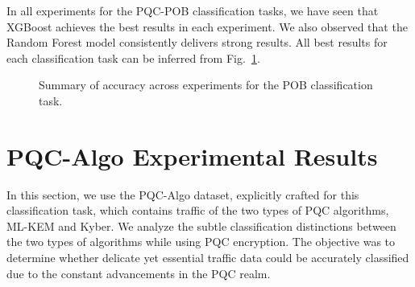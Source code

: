 \documentclass[10pt,journal]{IEEEtran}%
\begin{document}
In all experiments for the PQC-POB classification tasks, we have seen that XGBoost achieves the best results in each experiment. We also observed that the Random Forest model consistently delivers strong results. All best results for each classification task can be inferred from Fig.~\ref{fig:accuracy_experiments}.
\begin{figure}[htbp]
\centering
\footnotesize
{}
\caption{Summary of accuracy across experiments for the POB classification task.}
\label{fig:accuracy_experiments}
\end{figure}


\section{PQC-Algo Experimental Results}
\label{sec:algoex}
In this section, we use the PQC-Algo dataset, explicitly crafted for this classification task, which contains traffic of the two types of PQC algorithms, ML-KEM and Kyber\cite{NIST_FIPS_203_2024}. We analyze the subtle classification distinctions between the two types of algorithms while using PQC encryption.
The objective was to determine whether delicate yet essential traffic data could be accurately classified due to the constant advancements in the PQC realm.
\end{document}
